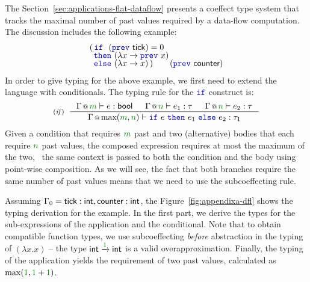 The Section~\ref{sec:applications-flat-dataflow} presents a coeffect type system that tracks the 
maximal number of past values required by a data-flow computation. The discussion includes the 
following example:
%
\begin{equation*}
\begin{array}{l}
(\,   \kvd{if}~~(\kvd{prev}~\ident{tick})=0\\[-0.25em]
\,\,\, \kvd{then}~(\lambda x \rightarrow \kvd{prev}~x)\\[-0.25em]
\,\,\, \kvd{else}~(\lambda x \rightarrow x) \,)\qquad(\kvd{prev}~\ident{counter})
\end{array}
\end{equation*}
%
In order to give typing for the above example, we first need to extend the language with 
conditionals. The typing rule for the $\kvd{if}$ construct is:
%
\begin{equation*}
\tyrule{if}
  { \coctx{\Gamma}{\cclrd{m}} \vdash e : \ident{bool} &
    \coctx{\Gamma}{\cclrd{n}} \vdash e_1 : \tau &
    \coctx{\Gamma}{\cclrd{n}} \vdash e_2 : \tau }
  {\coctx{\Gamma}{\textnormal{max}(\cclrd{m},\cclrd{n})} \vdash \kvd{if}~e~\kvd{then}~e_1~\kvd{else}~e_2 : \tau_1 }
\end{equation*}
%
Given a condition that requires $\cclrd{m}$ past and two (alternative) bodies that each require
$\cclrd{n}$ past values, the composed expression requires at most the maximum of the two, \ie~the
same context is passed to both the condition and the body using point-wise composition. As we will
see, the fact that both branches require the same number of past values means that we need to use
the subcoeffecting rule.

Assuming $\Gamma_0 = \ident{tick}:\ident{int}, \ident{counter}:\ident{int}$, the 
Figure~\ref{fig:appendixa-dfl} shows the typing derivation for the example. In the first part,
we derive the types for the sub-expressions of the application and the conditional. Note that 
to obtain compatible function types, we use subcoeffecting \emph{before} abstraction in the
typing of $(\lambda x.x)$ -- the type $\ident{int} \xrightarrow{\cclrd{1}} \ident{int}$ is  a
valid overapproximation. Finally, the typing of the application yields the requirement of two 
past values, calculated as $\textnormal{max}(\cclrd{1}, \cclrd{1}+\cclrd{1})$.

\newpage

